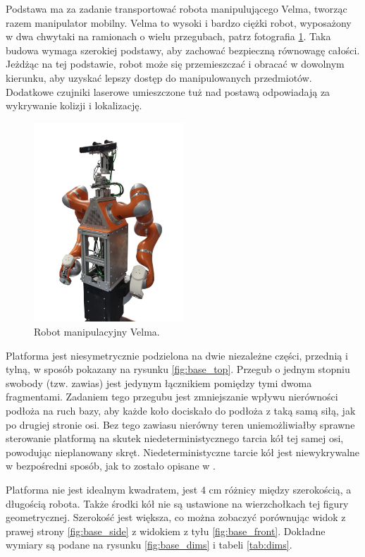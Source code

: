 	Podstawa ma za zadanie transportować robota manipulującego Velma, tworząc razem manipulator mobilny.
	Velma to wysoki i bardzo ciężki robot, wyposażony w dwa chwytaki na ramionach o wielu przegubach, patrz fotografia \ref{fig:velma}.
	Taka budowa wymaga szerokiej podstawy, aby zachować bezpieczną równowagę całości.
	Jeżdżąc na tej podstawie, robot może się przemieszczać i obracać w dowolnym kierunku, aby uzyskać lepszy dostęp do manipulowanych przedmiotów.
	Dodatkowe czujniki laserowe umieszczone tuż nad postawą odpowiadają za wykrywanie kolizji i lokalizację.

	\begin{figure}[H]
	\centering
	\includegraphics[width=0.5\textwidth]{graphics/velma.png}
	\caption{Robot manipulacyjny Velma.}
	\label{fig:velma}
	\end{figure} 

	Platforma jest niesymetrycznie podzielona na dwie niezależne części, przednią i tylną, w sposób pokazany na rysunku \ref{fig:base_top}.
	Przegub o jednym stopniu swobody (tzw. zawias) jest jedynym łącznikiem pomiędzy tymi dwoma fragmentami.
	Zadaniem tego przegubu jest zmniejszanie wpływu nierówności podłoża na ruch bazy, aby każde koło dociskało do podłoża z taką samą siłą, jak po drugiej stronie osi.
	Bez tego zawiasu nierówny teren uniemożliwiałby sprawne sterowanie platformą na skutek niedeterministycznego tarcia kół tej samej osi, powodując nieplanowany skręt.
	Niedeterministyczne tarcie kół jest niewykrywalne w bezpośredni sposób, jak to zostało opisane w \cite{boringbot}.

	Platforma nie jest idealnym kwadratem, jest 4 cm różnicy między szerokością, a długością robota.
	Także środki kół nie są ustawione na wierzchołkach tej figury geometrycznej.
	Szerokość jest większa, co można zobaczyć porównując widok z prawej strony \ref{fig:base_side} z widokiem z tyłu \ref{fig:base_front}.
	Dokładne wymiary są podane na rysunku \ref{fig:base_dims} i tabeli \ref{tab:dims}.

